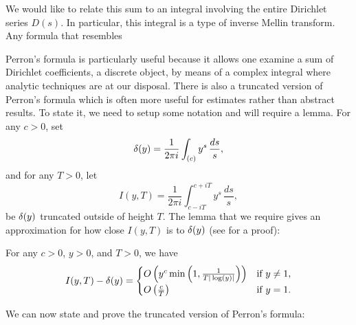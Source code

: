       We would like to relate this sum to an integral involving the entire Dirichlet series $D(s)$. In particular, this integral is a type of inverse Mellin transform. Any formula that resembles  

      Perron's formula is particularly useful because it allows one examine a sum of Dirichlet coefficients, a discrete object, by means of a complex integral where analytic techniques are at our disposal. There is also a truncated version of Perron's formula which is often more useful for estimates rather than abstract results. To state it, we need to setup some notation and will require a lemma. For any $c > 0$, set
      \[
        \delta(y) = \frac{1}{2\pi i}\int_{(c)}y^{s}\,\frac{ds}{s},
      \]
      and for any $T > 0$, let
      \[
        I(y,T) = \frac{1}{2\pi i}\int_{c-iT}^{c+iT}y^{s}\,\frac{ds}{s},
      \]
      be $\delta(y)$ truncated outside of height $T$. The lemma that we require gives an approximation for how close $I(y,T)$ is to $\delta(y)$ (see \cite{davenport2013multiplicative} for a proof):

      \begin{lemma}\label{lem:delta_truncation_estimate}
        For any $c > 0$, $y > 0$, and $T > 0$, we have
        \[
          I(y,T)-\delta(y) = \begin{cases} O\left(y^{c}\min\left(1,\frac{1}{T|\log(y)|}\right)\right) & \text{if $y \neq 1$}, \\ O\left(\frac{c}{T}\right) & \text{if $y = 1$}. \end{cases}
        \]
      \end{lemma}

      We can now state and prove the truncated version of Perron's formula:

